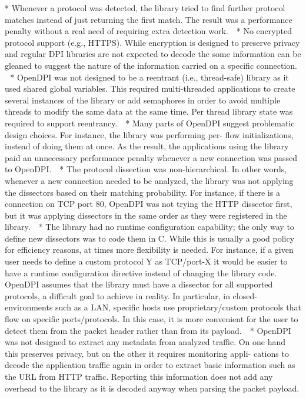 * Whenever a protocol was detected, the library tried to find further protocol matches instead of just returning the first match. The result was a performance penalty without a real need of requiring extra detection work.  
* No encrypted protocol support (e.g., HTTPS). While encryption is designed to preserve privacy and regular DPI libraries are not expected to decode the some information can be gleaned to suggest the nature of the information carried on a specific connection.  
* OpenDPI was not designed to be a reentrant (i.e., thread-safe) library as it used shared global variables. This required multi-threaded applications to create several instances of the library or add semaphores in order to avoid multiple threads to modify the same data at the same time. Per thread library state was required to support reentrancy.  
* Many parts of OpenDPI suggest problematic design choices. For instance, the library was performing per- flow initializations, instead of doing them at once. As the result, the applications using the library paid an unnecessary performance penalty whenever a new connection was passed to OpenDPI.  
* The protocol dissection was non-hierarchical. In other words, whenever a new connection needed to be analyzed, the library was not applying the dissectors based on their matching probability. For instance, if there is a connection on TCP port 80, OpenDPI was not trying the HTTP dissector first, but it was applying dissectors in the same order as they were registered in the library.  
* The library had no runtime configuration capability; the only way to define new dissectors was to code them in C. While this is usually a good policy for efficiency reasons, at times more flexibility is needed. For instance, if a given user needs to define a custom protocol Y as TCP/port-X it would be easier to have a runtime configuration directive instead of changing the library code. OpenDPI assumes that the library must have a dissector for all supported protocols, a difficult goal to achieve in reality. In particular, in closed-environments such as a LAN, specific hosts use proprietary/custom protocols that flow on specific ports/protocols. In this case, it is more convenient for the user to detect them from the packet header rather than from its payload.  
* OpenDPI was not designed to extract any metadata from analyzed traffic. On one hand this preserves privacy, but on the other it requires monitoring appli- cations to decode the application traffic again in order to extract basic information such as the URL from HTTP traffic. Reporting this information does not add any overhead to the library as it is decoded anyway when parsing the packet payload.  
